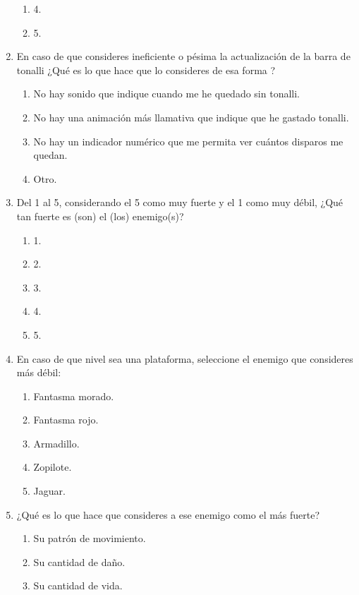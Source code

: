 \begin{enumerate}
\begin{enumerate}
            \item 4.
            \item 5.
        \end{enumerate}
    \item En caso de que consideres ineficiente o pésima la actualización de la
    barra de tonalli ¿Qué es lo que hace que lo consideres de esa forma ?
        \begin{enumerate}
            \item No hay sonido que indique cuando me he quedado sin tonalli.
            \item No hay una animación más llamativa que indique que he gastado
            tonalli.
            \item No hay un indicador numérico que me permita ver cuántos
            disparos me quedan.
            \item Otro.
        \end{enumerate}
    \item Del 1 al 5, considerando el 5 como muy fuerte y el 1 como muy débil,
    ¿Qué tan fuerte es (son) el (los) enemigo(s)?
        \begin{enumerate}
            \item 1.
            \item 2.
            \item 3.
            \item 4.
            \item 5.
        \end{enumerate}
    \item En caso de que nivel sea una plataforma, seleccione el enemigo que
    consideres más débil:
        \begin{enumerate}
            \item Fantasma morado.
            \item Fantasma rojo.
            \item Armadillo.
            \item Zopilote.
            \item Jaguar.
        \end{enumerate}
    \item ¿Qué es lo que hace que consideres a ese enemigo como el más fuerte?
        \begin{enumerate}
            \item Su patrón de movimiento.
            \item Su cantidad de daño.
            \item Su cantidad de vida.

\end{enumerate}
\end{enumerate}
